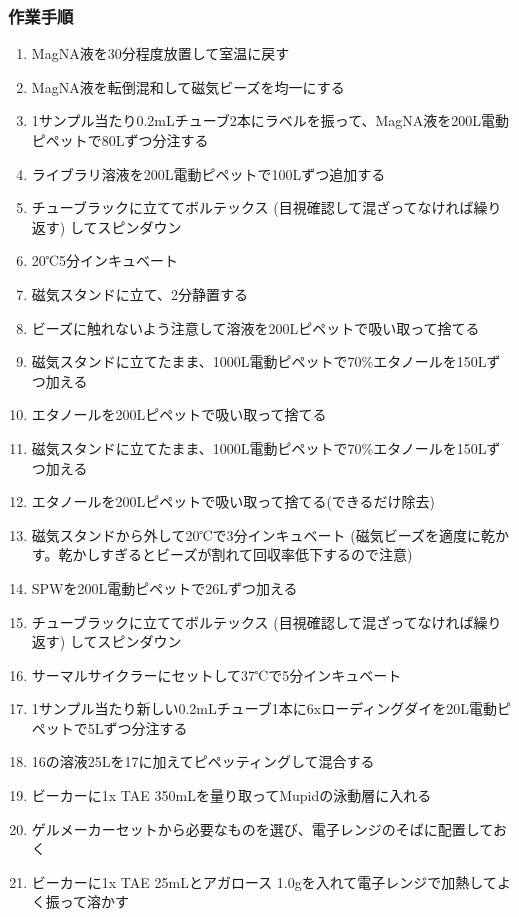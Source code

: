 \documentclass[titlepage,10pt,a4paper,uplatex]{jsbook}
\begin{document}
\subsubsection{作業手順}
\begin{enumerate}
\item MagNA液を30分程度放置して室温に戻す
\item MagNA液を転倒混和して磁気ビーズを均一にする
\item 1サンプル当たり0.2mLチューブ2本にラベルを振って、MagNA液を200{\textmu}L電動ピペットで80{\textmu}Lずつ分注する
\item ライブラリ溶液を200{\textmu}L電動ピペットで100{\textmu}Lずつ追加する
\item チューブラックに立ててボルテックス (目視確認して混ざってなければ繰り返す) してスピンダウン
\item 20℃5分インキュベート
\item 磁気スタンドに立て、2分静置する
\item ビーズに触れないよう注意して溶液を200{\textmu}Lピペットで吸い取って捨てる
\item 磁気スタンドに立てたまま、1000{\textmu}L電動ピペットで70\%エタノールを150{\textmu}Lずつ加える
\item エタノールを200{\textmu}Lピペットで吸い取って捨てる
\item 磁気スタンドに立てたまま、1000{\textmu}L電動ピペットで70\%エタノールを150{\textmu}Lずつ加える
\item エタノールを200{\textmu}Lピペットで吸い取って捨てる(できるだけ除去)
\item 磁気スタンドから外して20℃で3分インキュベート (磁気ビーズを適度に乾かす。乾かしすぎるとビーズが割れて回収率低下するので注意)
\item SPWを200{\textmu}L電動ピペットで26{\textmu}Lずつ加える
\item チューブラックに立ててボルテックス (目視確認して混ざってなければ繰り返す) してスピンダウン
\item サーマルサイクラーにセットして37℃で5分インキュベート
\item 1サンプル当たり新しい0.2mLチューブ1本に6xローディングダイを20{\textmu}L電動ピペットで5{\textmu}Lずつ分注する
\item 16の溶液25{\textmu}Lを17に加えてピペッティングして混合する
\item ビーカーに1x TAE 350mLを量り取ってMupidの泳動層に入れる
\item ゲルメーカーセットから必要なものを選び、電子レンジのそばに配置しておく
\item ビーカーに1x TAE 25mLとアガロース 1.0gを入れて電子レンジで加熱してよく振って溶かす

\end{enumerate}
\end{document}
